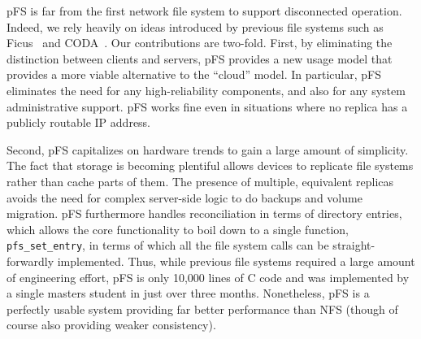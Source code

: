 pFS is far from the first network file system to support disconnected
operation.  Indeed, we rely heavily on ideas introduced by previous
file systems such as Ficus~\cite{page:ficus} and
CODA~\cite{kistler:coda}.  Our contributions are two-fold.  First, by
eliminating the distinction between clients and servers, pFS provides
a new usage model that provides a more viable alternative to the
``cloud'' model.  In particular, pFS eliminates the need for any
high-reliability components, and also for any system administrative
support.  pFS works fine even in situations where no replica has a
publicly routable IP address.

Second, pFS capitalizes on hardware trends to gain a large amount of
simplicity.  The fact that storage is becoming plentiful allows
devices to replicate file systems rather than cache parts of them.
The presence of multiple, equivalent replicas avoids the need for
complex server-side logic to do backups and volume migration.  pFS
furthermore handles reconciliation in terms of directory entries,
which allows the core functionality to boil down to a single function,
\texttt{pfs\_set\_entry}, in terms of which all the file system calls
can be straight-forwardly implemented.  Thus, while previous file
systems required a large amount of engineering effort, pFS is only
10,000 lines of C code and was implemented by a single masters student
in just over three months.  Nonetheless, pFS is a perfectly usable
system providing far better performance than NFS (though of course
also providing weaker consistency).


